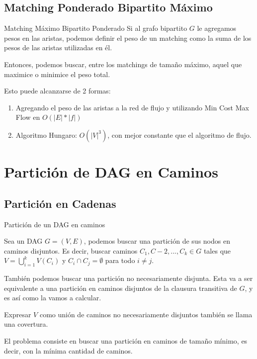 \documentclass{beamer}
\begin{document}
\subsection{ Matching Ponderado Bipartito Máximo }

\begin{frame}{Matching Máximo Bipartito Ponderado}
    Si al grafo bipartito $G$ le agregamos pesos en las aristas, podemos definir el peso de un matching como la suma de los pesos de las aristas utilizadas en él.

    Entonces, podemos buscar, entre los matchings de tamaño máximo, aquel que maximice o minimice el peso total.

    Esto puede alcanzarse de 2 formas:

    \begin{enumerate}
        \item Agregando el peso de las aristas a la red de flujo y utilizando Min Cost Max Flow en $O(|E|*|f|)$
        \item Algoritmo Hungaro: $O(|V|^3)$, con mejor constante que el algoritmo de flujo.
    \end{enumerate}
\end{frame}

\section{Partición de DAG en Caminos}
    \subsection{Partición en Cadenas}
    \begin{frame}{Partición de un DAG en caminos}
        
        \begin{definition}
           Sea un DAG $G = (V,E)$, podemos buscar una partición de sus nodos en caminos disjuntos. Es decir, buscar caminos $C_1, C-2, ..., C_k \in G$ tales que $V = \bigcup_{i=1}^k V(C_i)$ y $C_i \cap C_j = \emptyset$ para todo $i \neq j$.
        \end{definition}
        
        También podemos buscar una partición no necesariamente disjunta. Esta va a ser equivalente a una partición en caminos disjuntos de la clausura transitiva de $G$, y es así como la vamos a calcular.

        Expresar $V$ como unión de caminos no necesariamente disjuntos también se llama una covertura. 

        El problema consiste en buscar una partición en caminos de tamaño mínimo, es decir, con la mínima cantidad de caminos.
    \end{frame}
\end{document}

